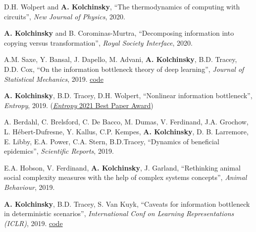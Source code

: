D.H. Wolpert and \textbf{A. Kolchinsky}, ``The thermodynamics of computing with circuits'', \emph{New Journal of Physics}, 2020.  %
 

\textbf{A. Kolchinsky} and B. Corominas-Murtra, ``Decomposing information into copying versus transformation'', 
\emph{Royal Society Interface}, 2020. %
 

A.M. Saxe, Y. Bansal, J. Dapello, M. Advani, \textbf{A. Kolchinsky}, B.D. Tracey, D.D. Cox, 
``On the information bottleneck theory of deep learning'',  \emph{Journal of Statistical Mechanics}, 2019. 
\href{https://github.com/artemyk/ibsgd/tree/iclr2018}{code}  %

\textbf{A. Kolchinsky}, B.D. Tracey, D.H. Wolpert, ``Nonlinear information bottleneck'', \emph{Entropy}, 2019.
 (\href{https://www.mdpi.com/journal/entropy/awards/1209}{{\emph{Entropy} 2021 Best Paper Award}})  

A. Berdahl, C. Brelsford, C. De Bacco, M. Dumas, V. Ferdinand, J.A. Grochow, L. Hébert-Dufresne,
Y. Kallus, C.P. Kempes, \textbf{A. Kolchinsky}, D. B. Larremore,
E. Libby, E.A. Power, C.A. Stern, B.D.Tracey, ``Dynamics of beneficial epidemics'', \emph{Scientific Reports}, 2019. 
 

E.A. Hobson, V. Ferdinand, \textbf{A. Kolchinsky}, J. Garland, 
``Rethinking animal social complexity measures with the help of complex systems concepts'', 
\emph{Animal Behaviour}, 2019. 
 

\textbf{A. Kolchinsky}, B.D. Tracey, S. Van Kuyk, ``Caveats for information bottleneck in deterministic scenarios'', \emph{International Conf on Learning Representations (ICLR)}, 2019. 
\href{https://github.com/artemyk/ibcurve}{code} 


